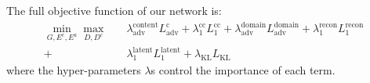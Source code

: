\documentclass[runningheads]{llncs}
\begin{document}
The full objective function of our network is:
\vspace{\eqmargin}
\begin{equation}
\begin{aligned}
\min_{G,E^c,E^a}\max_{D,D^c}\quad &\lambda_{\mathrm{adv}}^{\mathrm{content}}L_{\mathrm{adv}}^{\mathrm{c}}+\lambda_1^{\mathrm{cc}}L_1^{\mathrm{cc}} + \lambda_{\mathrm{adv}}^{\mathrm{domain}}L_{\mathrm{adv}}^{\mathrm{domain}}+ \lambda_1^{\mathrm{recon}} L_1^{\mathrm{recon}}\\
 + &\lambda_1^{\mathrm{latent}}L_1^{\mathrm{latent}}+ \lambda_{\mathrm{KL}}L_{\mathrm{KL}}
\end{aligned}
\end{equation}
\vspace{\eqmargin}
where the hyper-parameters $\lambda$s control the importance of each term. 
%



%
\end{document}
